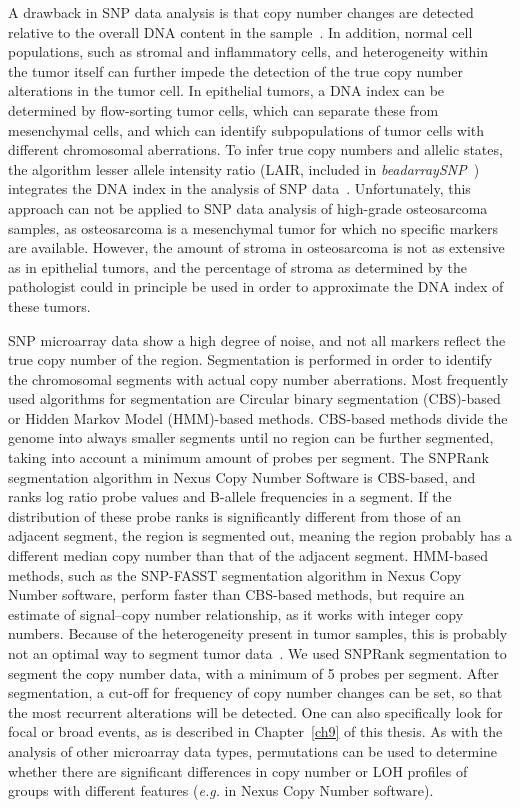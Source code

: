 A drawback in SNP data analysis is that copy number changes are detected relative to the overall DNA content in the sample~\cite{attiyeh2009genomic}. In addition, normal cell populations, such as stromal and inflammatory cells, and heterogeneity within the tumor itself can further impede the detection of the true copy number alterations in the tumor cell. In epithelial tumors, a DNA index can be determined by flow\hyp{}sorting tumor cells, which can separate these from mesenchymal cells, and which can identify subpopulations of tumor cells with different chromosomal aberrations. To infer true copy numbers and allelic states, the algorithm lesser allele intensity ratio (LAIR, included in {\it beadarraySNP}~\cite{oosting2010beadarraysnp}) integrates the DNA index in the analysis of SNP data~\cite{corver2008genome}. Unfortunately, this approach can not be applied to SNP data analysis of high\hyp{}grade osteosarcoma samples, as osteosarcoma is a mesenchymal tumor for which no specific markers are available. However, the amount of stroma in osteosarcoma is not as extensive as in epithelial tumors, and the percentage of stroma as determined by the pathologist could in principle be used in order to approximate the DNA index of these tumors.

SNP microarray data show a high degree of noise, and not all markers reflect the true copy number of the region. Segmentation is performed in order to identify the chromosomal segments with actual copy number aberrations. Most frequently used algorithms for segmentation are Circular binary segmentation (CBS)\hyp{}based~\cite{olshen2004circular} or Hidden Markov Model (HMM)\hyp{}based methods. CBS\hyp{}based methods divide the genome into always smaller segments until no region can be further segmented, taking into account a minimum amount of probes per segment. The SNPRank segmentation algorithm in Nexus Copy Number Software is CBS\hyp{}based, and ranks log ratio probe values and B-allele frequencies in a segment. If the distribution of these probe ranks is significantly different from those of an adjacent segment, the region is segmented out, meaning the region probably has a different median copy number than that of the adjacent segment. HMM\hyp{}based methods, such as the SNP-FASST segmentation algorithm in Nexus Copy Number software, perform faster than CBS\hyp{}based methods, but require an estimate of signal--copy number relationship, as it works with integer copy numbers. Because of the heterogeneity present in tumor samples, this is probably not an optimal way to segment tumor data~\cite{rasmussen2011allele}. We used SNPRank segmentation to segment the copy number data, with a minimum of 5 probes per segment. After segmentation, a cut-off for frequency of copy number changes can be set, so that the most recurrent alterations will be detected. One can also specifically look for focal or broad events, as is described in Chapter~\ref{ch9} of this thesis. As with the analysis of other microarray data types, permutations can be used to determine whether there are significant differences in copy number or LOH profiles of groups with different features ({\it e.g.} in Nexus Copy Number software).

